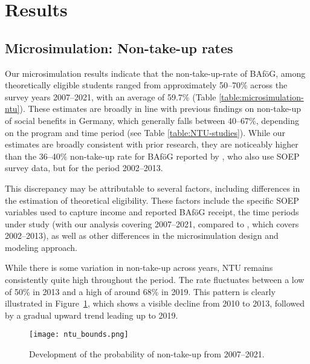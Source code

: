 %
%

\section{Results}
\subsection{Microsimulation: Non-take-up rates}

Our microsimulation results indicate that the non-take-up-rate of BAföG, among theoretically eligible students ranged from approximately 50--70\% across the survey years 2007--2021, with an average of 59.7\%  (Table \ref{table:microsimulation-ntu}). These estimates are broadly in line with previous findings on non-take-up of social benefits in Germany, which generally falls between 40--67\%, depending on the program and time period (see Table \ref{table:NTU-studies}). 
While our estimates are broadly consistent with prior research, they are noticeably higher than the 36--40\% non-take-up rate for BAföG reported by \cite{herber_non-take-up_2019}, who also use SOEP survey data, but for the period 2002--2013.




This discrepancy may be attributable to several factors, including differences in the estimation of theoretical eligibility. These factors include the specific SOEP variables used to capture income and reported BAföG receipt, the time periods under study (with our analysis covering 2007--2021, compared to \cite{herber_non-take-up_2019}, which covers 2002--2013), as well as other differences in the microsimulation design and modeling approach.


While there is some variation in non-take-up across years, NTU remains consistently quite high throughout the period. 
The rate fluctuates between a low of 50\% in 2013 and a high of around 68\% in 2019. 
This pattern is clearly illustrated in Figure~\ref{fig:ntu_bounds_over_years}, which shows a visible decline from 2010 to 2013, followed by a gradual upward trend leading up to 2019. 

\begin{figure}[htbp]
  \centering
  \texttt{[image: ntu\_bounds.png]}
  \caption{Development of the probability of non-take-up from 2007--2021.}
  \label{fig:ntu_bounds_over_years}
\end{figure}

